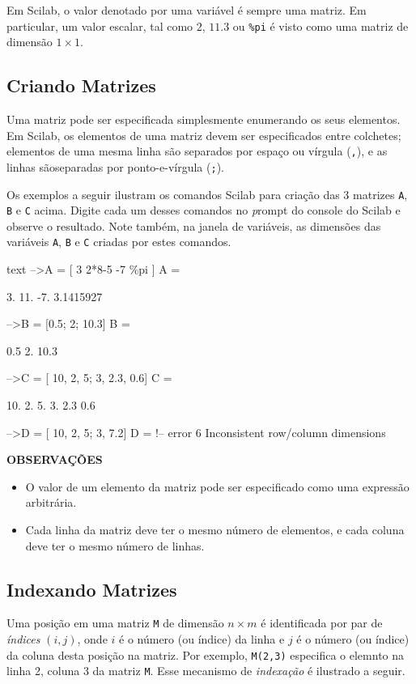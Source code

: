 \documentclass[11pt,fleqn]{practice}
\begin{document}
Em Scilab, o valor denotado por uma variável é sempre uma matriz. Em particular,  um valor escalar, 
tal como $2$, $11.3$ ou \texttt{\%pi} é visto como uma matriz de dimensão $1\times 1$.

\subsection{Criando Matrizes}

Uma matriz pode ser especificada simplesmente enumerando os seus elementos. Em Scilab, os elementos de uma matriz devem ser especificados entre colchetes; elementos de uma mesma linha
são separados por espaço ou vírgula (\texttt{,}), e as linhas sãoseparadas por ponto-e-vírgula (\texttt{;}).

Os exemplos a seguir ilustram os comandos Scilab para criação das 3 matrizes \texttt{A}, \texttt{B} e \texttt{C} acima. Digite cada um desses comandos no {\emph prompt} do console do Scilab e observe o resultado. Note também, na janela de variáveis, as dimensões das variáveis \texttt{A}, \texttt{B} e \texttt{C} criadas por estes comandos.

\begin{lst}{text}
-->A = [ 3  2*8-5  -7 \%pi ]
 A =
 
     3.    11.    -7.    3.1415927  

-->B = [0.5; 2; 10.3] 
 B  =
 
      0.5
      2.
      10.3
 
-->C = [ 10, 2, 5; 3, 2.3, 0.6]
 C  =
 
     10.    2.      5.
     3.      2.3    0.6
     
-->D = [ 10, 2, 5; 3, 7.2]
 D  =
                       !-- error 6
Inconsistent row/column dimensions
\end{lst} 

\textbf{OBSERVAÇÕES}
\begin{itemize}
\item O valor de um elemento da matriz pode ser especificado como uma expressão arbitrária.
\item Cada linha da matriz deve ter o mesmo número de elementos, 
e cada coluna deve ter o mesmo número de linhas.
\end{itemize}  

\subsection{Indexando Matrizes}

Uma posição em uma matriz \texttt{M} de dimensão $n\times m$ é identificada por par de \emph{índices} $(i,j)$, onde $i$ é o número (ou índice) da linha e $j$ é o número (ou índice) da coluna desta posição na matriz. Por exemplo, \texttt{M(2,3)} especifica o elemnto na linha 2, coluna 3 da matriz \texttt{M}. Esse mecanismo de \emph{indexação} é ilustrado a seguir. 
\end{document}
